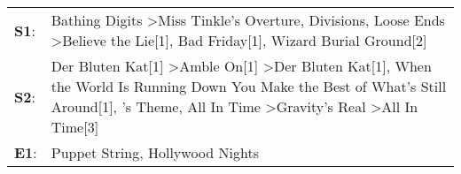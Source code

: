 \begin{supertabular}{p{0.03\textwidth}p{0.92\textwidth}}
 \textbf{S1}:  &                                                                                                                  Bathing Digits\textsuperscript{} \textgreater \enspace Miss Tinkle's Overture\textsuperscript{}, \enspace Divisions\textsuperscript{}, \enspace Loose Ends\textsuperscript{} \textgreater \enspace Believe the Lie[1]\textsuperscript{}, \enspace Bad Friday[1]\textsuperscript{}, \enspace Wizard Burial Ground[2]\textsuperscript{}  \enspace  \\
 \textbf{S2}:  &  Der Bluten Kat[1]\textsuperscript{} \textgreater \enspace Amble On[1]\textsuperscript{} \textgreater \enspace Der Bluten Kat[1]\textsuperscript{}, \enspace When the World Is Running Down You Make the Best of What's Still Around[1]\textsuperscript{}, 's Theme\textsuperscript{}, \enspace All In Time\textsuperscript{} \textgreater \enspace Gravity's Real\textsuperscript{} \textgreater \enspace All In Time[3]\textsuperscript{}  \enspace  \\
 \textbf{E1}:  &                                                                                                                                                                                                                                                                                                                                                                           Puppet String\textsuperscript{}, \enspace Hollywood Nights\textsuperscript{}  \enspace  \\
\end{supertabular}
